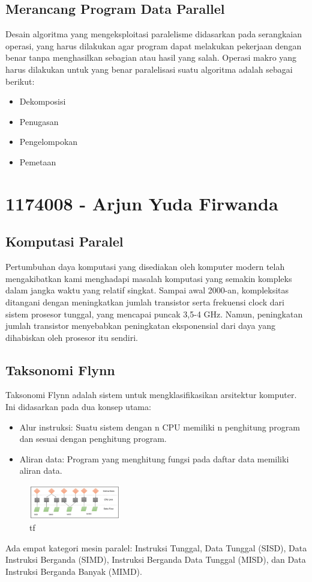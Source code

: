 \subsection{Merancang Program Data Parallel}
\hfill\break
Desain algoritma yang mengeksploitasi paralelisme didasarkan pada serangkaian operasi, yang harus dilakukan agar program dapat melakukan pekerjaan dengan benar tanpa menghasilkan sebagian atau hasil yang salah. Operasi makro yang harus dilakukan untuk yang benar paralelisasi suatu algoritma adalah sebagai berikut:
\begin{itemize}
	\item Dekomposisi 
	\item Penugasan
	\item Pengelompokan
	\item Pemetaan
\end{itemize}

\section{1174008 - Arjun Yuda Firwanda}
\subsection{Komputasi Paralel}
\hfill\break
Pertumbuhan daya komputasi yang disediakan oleh komputer modern telah mengakibatkan kami menghadapi masalah komputasi yang semakin kompleks dalam jangka waktu yang relatif singkat. Sampai awal 2000-an, kompleksitas ditangani dengan meningkatkan jumlah transistor serta frekuensi clock dari sistem prosesor tunggal, yang mencapai puncak 3,5-4 GHz. Namun, peningkatan jumlah transistor menyebabkan peningkatan eksponensial dari daya yang dihabiskan oleh prosesor itu sendiri.

\hfill\break
\subsection{Taksonomi Flynn }
\hfill\break
Taksonomi Flynn adalah sistem untuk mengklasifikasikan arsitektur komputer. Ini didasarkan pada dua konsep utama:
\begin{itemize}
	\item Alur instruksi: Suatu sistem dengan n CPU memiliki n penghitung program dan sesuai dengan penghitung program.
	\item Aliran data: Program yang menghitung fungsi pada daftar data memiliki aliran data.
\end{itemize}
\hfill\break
    \begin{figure}[H]
        \includegraphics[width=4cm]{figures/kelompok3/1/arjun1.png}
        \centering
        \caption{tf}
    \end{figure}
Ada empat kategori mesin paralel: Instruksi Tunggal, Data Tunggal (SISD), Data Instruksi Berganda (SIMD), Instruksi Berganda Data Tunggal (MISD), dan Data Instruksi Berganda Banyak (MIMD).


